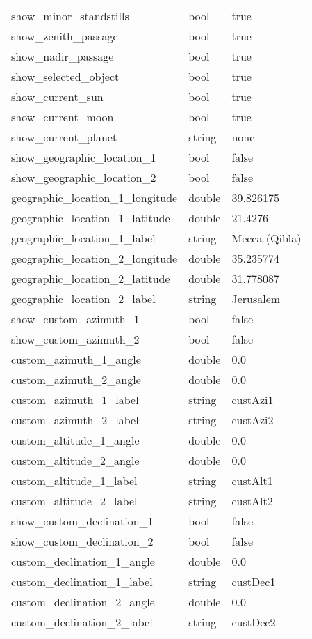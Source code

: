 \begin{longtable}{l|l|l}
show\_minor\_standstills       &bool        & true  \\
show\_zenith\_passage          &bool        & true  \\
show\_nadir\_passage           &bool        & true  \\
show\_selected\_object         &bool        & true  \\
show\_current\_sun             &bool        & true  \\
show\_current\_moon            &bool        & true  \\
show\_current\_planet          &string      & none  \\\midrule
show\_geographic\_location\_1  &bool        & false         \\
show\_geographic\_location\_2  &bool        & false         \\
geographic\_location\_1\_longitude &double  & 39.826175     \\
geographic\_location\_1\_latitude  &double  & 21.4276       \\
geographic\_location\_1\_label     &string  & Mecca (Qibla) \\
geographic\_location\_2\_longitude &double  & 35.235774     \\
geographic\_location\_2\_latitude  &double  & 31.778087     \\
geographic\_location\_2\_label     &string  & Jerusalem     \\\midrule
show\_custom\_azimuth\_1       &bool        & false    \\
show\_custom\_azimuth\_2       &bool        & false    \\
custom\_azimuth\_1\_angle      &double      & 0.0      \\
custom\_azimuth\_2\_angle      &double      & 0.0      \\
custom\_azimuth\_1\_label      &string      & custAzi1 \\
custom\_azimuth\_2\_label      &string      & custAzi2 \\
custom\_altitude\_1\_angle     &double      & 0.0      \\
custom\_altitude\_2\_angle     &double      & 0.0      \\
custom\_altitude\_1\_label     &string      & custAlt1 \\
custom\_altitude\_2\_label     &string      & custAlt2 \\\midrule
show\_custom\_declination\_1   &bool        & false    \\
show\_custom\_declination\_2   &bool        & false    \\
custom\_declination\_1\_angle  &double      & 0.0      \\
custom\_declination\_1\_label  &string      & custDec1 \\
custom\_declination\_2\_angle  &double      & 0.0      \\
custom\_declination\_2\_label  &string      & custDec2 \\\bottomrule
\end{longtable}




